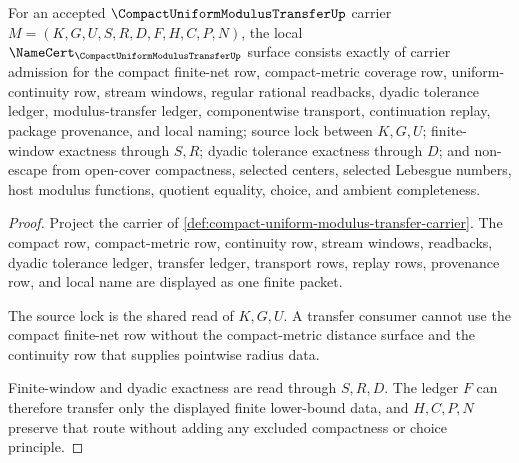 \begin{theorem}
\label{thm:compact-uniform-modulus-transfer-namecert-obligations}
For an accepted $\CompactUniformModulusTransferUp$ carrier $M=(K,G,U,S,R,D,F,H,C,P,N)$, the local $\NameCert_{\CompactUniformModulusTransferUp}$ surface consists exactly of carrier admission for the compact finite-net row, compact-metric coverage row, uniform-continuity row, stream windows, regular rational readbacks, dyadic tolerance ledger, modulus-transfer ledger, componentwise transport, continuation replay, package provenance, and local naming; source lock between $K,G,U$; finite-window exactness through $S,R$; dyadic tolerance exactness through $D$; and non-escape from open-cover compactness, selected centers, selected Lebesgue numbers, host modulus functions, quotient equality, choice, and ambient completeness.
\end{theorem}
\begin{proof}
Project the carrier of \autoref{def:compact-uniform-modulus-transfer-carrier}. The compact row, compact-metric row, continuity row, stream windows, readbacks, dyadic tolerance ledger, transfer ledger, transport rows, replay rows, provenance row, and local name are displayed as one finite packet.

The source lock is the shared read of $K,G,U$. A transfer consumer cannot use the compact finite-net row without the compact-metric distance surface and the continuity row that supplies pointwise radius data.

Finite-window and dyadic exactness are read through $S,R,D$. The ledger $F$ can therefore transfer only the displayed finite lower-bound data, and $H,C,P,N$ preserve that route without adding any excluded compactness or choice principle.
\end{proof}

